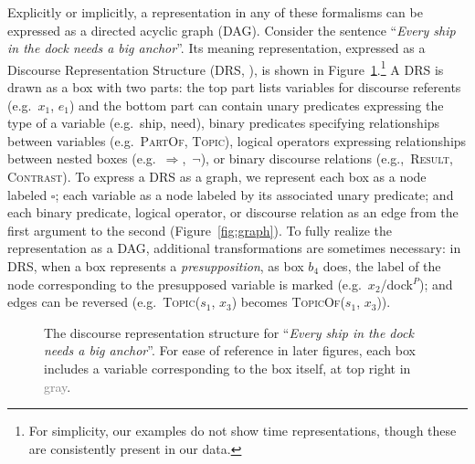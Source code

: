 \documentclass[11pt,a4paper]{article}
\theoremstyle{plain}
\begin{document}
Explicitly or implicitly, a representation in any of these formalisms can be expressed as a directed acyclic graph (DAG). Consider the sentence ``\textsl{Every ship in the dock needs a big anchor}''. Its meaning representation, expressed as a Discourse Representation Structure (DRS, \citealt{kamp1981theory}), is shown in Figure~\ref{fig:drs}.\footnote{For simplicity, our examples do not show time representations, though these are consistently present in our data.} A DRS is drawn as a box with two parts: the top part lists variables for discourse referents (e.g.~$x_1$, $e_1$) and the bottom part can contain unary predicates expressing the type of a variable (e.g.~ship, need), binary predicates specifying relationships between variables (e.g.~\textsc{PartOf}, \textsc{Topic}), logical operators expressing relationships between nested boxes (e.g.~$\Rightarrow$,~$\lnot$), or binary discourse relations (e.g.,~\textsc{Result}, \textsc{Contrast}). To express a DRS as a graph, we represent each box as a node labeled $\square$; each variable as a node labeled by its associated unary predicate; and each binary predicate, logical operator, or discourse relation as an edge from the first argument to the second (Figure~\ref{fig:graph}). To fully realize the representation as a DAG, additional transformations are sometimes necessary: in DRS, when a box represents a \emph{presupposition}, as box $b_4$ does, the label of the node corresponding to the presupposed variable is marked (e.g.~$x_2$/dock$^P$); and edges can be reversed (e.g.~\textsc{Topic}($s_1$, $x_3$) becomes \textsc{TopicOf}($s_1$, $x_3$)).

\begin{figure}\footnotesize
{} 
\caption{The discourse representation structure for ``\textsl{Every
    ship in the dock needs a big anchor}''. For ease of reference in
  later figures, each box includes a variable corresponding to the box itself, at top right in \textcolor{gray}{gray}.}\label{fig:drs}
\end{figure}
\end{document}
